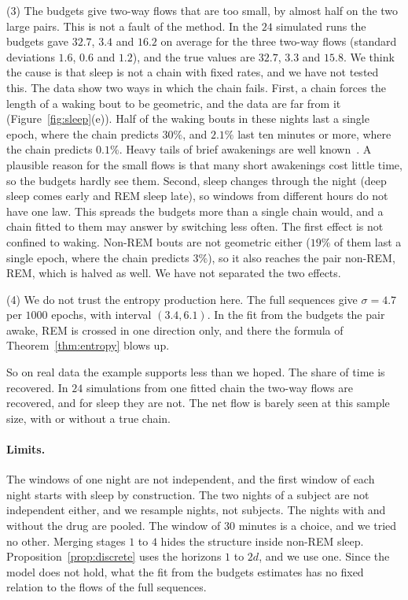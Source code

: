 \documentclass[11pt]{article}
\theoremstyle{definition}
\theoremstyle{remark}
\begin{document}
(3) The budgets give two-way flows that are too small, by almost half on the
two large pairs. This is not a fault of the method. In the $24$ simulated runs
the budgets gave $32.7$, $3.4$ and $16.2$ on average for the three two-way
flows (standard deviations $1.6$, $0.6$ and $1.2$), and the true values are
$32.7$, $3.3$ and $15.8$. We think the cause is that sleep is not a chain with
fixed rates, and we have not tested this. The data show two ways in which the
chain fails. First, a chain forces the length of
a waking bout to be geometric, and the data are far from it
(Figure~\ref{fig:sleep}(e)). Half of the waking bouts in these nights last a
single epoch, where the chain predicts $30\%$, and $2.1\%$ last ten minutes or
more, where the chain predicts $0.1\%$. Heavy tails of brief awakenings are
well known~\cite{lo2004}. A plausible reason for the small flows is that many
short awakenings cost little time, so the budgets hardly see them. Second, sleep changes through the night (deep sleep
comes early and REM sleep late), so windows from different hours do not have
one law. This spreads the budgets more than a single chain would, and a chain
fitted to them may answer by switching less often. The first effect is not
confined to waking. Non-REM bouts are not geometric either ($19\%$ of them last
a single epoch, where the chain predicts $3\%$), so it also reaches the pair
non-REM, REM, which is halved as well. We have not separated the two effects.

(4) We do not trust the entropy production here. The full sequences give
$\sigma=4.7$ per $1000$ epochs, with interval $(3.4,6.1)$. In the fit from the
budgets the pair awake, REM is crossed in one direction only, and there the
formula of Theorem~\ref{thm:entropy} blows up.

So on real data the example supports less than we hoped. The share of time is
recovered. In $24$ simulations from one fitted chain the two-way flows are
recovered, and for sleep they are not. The net flow is barely seen at this sample size, with or
without a true chain.

\paragraph{Limits.} The windows of one night are not independent, and the first
window of each night starts with sleep by construction. The two nights of a
subject are not independent either, and we resample nights, not subjects. The
nights with and without the drug are pooled. The window of $30$ minutes is a
choice, and we tried no other. Merging stages $1$ to $4$ hides the structure
inside non-REM sleep. Proposition~\ref{prop:discrete} uses the horizons $1$ to
$2d$, and we use one. Since the model does not hold, what the fit from the budgets
estimates has no fixed relation to the flows of the full sequences.
\end{document}
